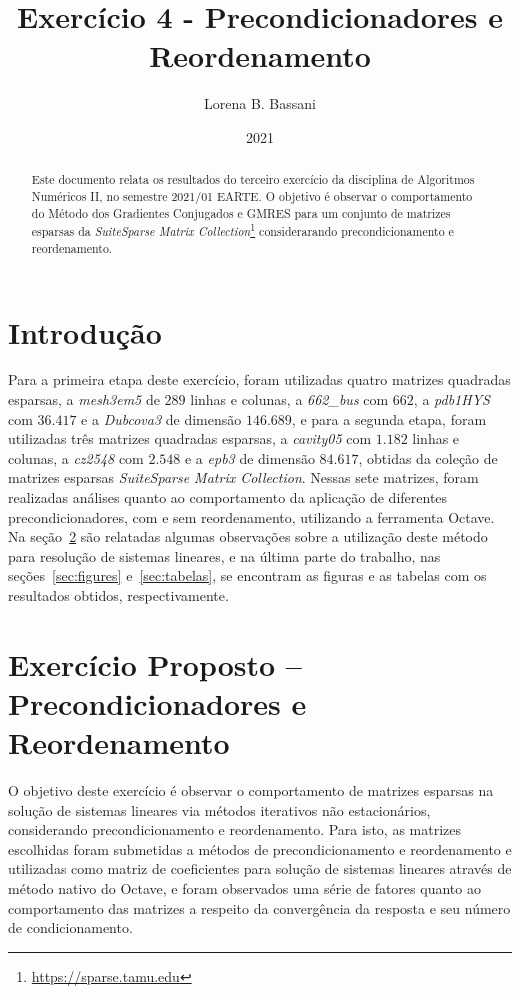 \documentclass{article}
\title{Exercício 4 - Precondicionadores e Reordenamento}
\author{Lorena B. Bassani}
\date{2021}
\begin{document}
\maketitle

\begin{abstract}
    Este documento relata os resultados do terceiro exercício da disciplina de Algoritmos Numéricos II, no semestre 2021/01 EARTE. O objetivo é observar o comportamento do Método dos Gradientes Conjugados e GMRES para um conjunto de matrizes esparsas da \textit{SuiteSparse Matrix Collection}\footnote{\href{https://sparse.tamu.edu}{https://sparse.tamu.edu}} considerarando precondicionamento e reordenamento.
\end{abstract}

\section{Introdução}
Para a primeira etapa deste exercício, foram utilizadas quatro matrizes quadradas esparsas, a \textit{mesh3em5} de $289$ linhas e colunas, a \textit{662\_bus} com $662$, a \textit{pdb1HYS} com $36.417$ e a \textit{Dubcova3} de dimensão $146.689$, e para a segunda etapa, foram utilizadas três matrizes quadradas esparsas, a \textit{cavity05} com $1.182$ linhas e colunas, a \textit{cz2548} com $2.548$ e a \textit{epb3} de dimensão $84.617$, obtidas da coleção de matrizes esparsas \textit{SuiteSparse Matrix Collection}. Nessas sete matrizes, foram realizadas análises quanto ao comportamento da aplicação de diferentes precondicionadores, com e sem reordenamento, utilizando a ferramenta Octave. Na seção~\ref{sec:resultados} são relatadas algumas observações sobre a utilização deste método para resolução de sistemas lineares, e na última parte do trabalho, nas seções~\ref{sec:figures} e~\ref{sec:tabelas}, se encontram as figuras e as tabelas com os resultados obtidos, respectivamente.

\section{Exercício Proposto -- Precondicionadores e Reordenamento}
\label{sec:resultados}
O objetivo deste exercício é observar o comportamento de matrizes esparsas na solução de sistemas lineares via métodos iterativos não estacionários, considerando precondicionamento e reordenamento. Para isto, as matrizes escolhidas foram submetidas a métodos de precondicionamento e reordenamento e utilizadas como matriz de coeficientes para solução de sistemas lineares através de método nativo do Octave, e foram observados uma série de fatores quanto ao comportamento das matrizes a respeito da convergência da resposta e seu número de condicionamento.
\end{document}
